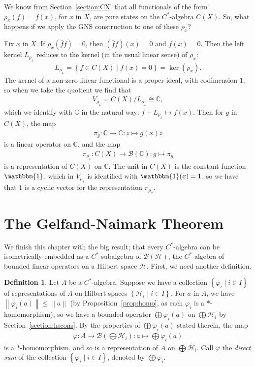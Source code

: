 \documentclass[11pt,a4paper]{report}
\theoremstyle{plain}
\theoremstyle{definition}
\newtheorem{defn}{Definition}
\newcommand{\1}{\mathbbm{1}}
\newcommand{\C}{\mathbb{C}}
\renewcommand{\H}{\mathcal{H}}
\newcommand{\B}{\mathcal{B}}
\newcommand{\BH}{\mathcal{\B(\H)}}
\renewcommand{\phi}{\varphi}
\newcommand{\CX}{C(X)}
\renewcommand{\bar}{\overline}
\renewcommand{\oplus}{\textstyle\bigoplus}
\begin{document}
We know from Section~\ref{section:CX} that all functionals of the form 
$\rho_x(f) = f(x)$, for $x$ in $X$, are pure states on the $C^\ast$-algebra 
$\CX$. So, what happens if we apply the GNS construction to one of these 
$\rho_x$?


Fix $x$ in $X$. If $\rho_x(\bar f f)=0$, then $(\bar f f)(x)=0$ and $f(x)=0$. 
Then the left kernel $L_{\rho_x}$ reduces to the kernel (in the usual linear 
sense) of $\rho_x$:
\begin{align*}
	L_{\rho_x} = \left\{f\in\CX \mid f(x) = 0\right\} = \ker(\rho_x).
\end{align*}
The kernel of a non-zero linear functional is a proper ideal, with codimension 
$1$, so when we take the quotient we find that 
\begin{align*}
	V_{\rho_x} = \CX/L_{\rho_x} \cong \C,
\end{align*}
which we identify with $\C$ in the natural way: $f+L_{\rho_x} \mapsto f(x)$.
Then for $g$ in $\CX$, the map 
\begin{align*}
	\pi_g:\C\to\C:z\mapsto g(x)z
\end{align*} 
is a linear operator on $\C$, and the map 
\begin{align*}
	\pi_{\rho_x}:\CX\to\B(\C):g\mapsto\pi_g
\end{align*} 
is a representation of $\CX$ on $\C$. The unit in $\CX$ is the constant function 
$\1$, which in $V_{\rho_x}$ is identified with $\1(x)=1$; so we have that $1$ is 
a cyclic vector for the representation $\pi_{\rho_x}$.


\section{The Gelfand-Naimark Theorem}\label{section:gn}
We finish this chapter with the big result; that every $C^\ast$-algebra can be 
isometrically embedded as a $C^\ast$-subalgebra of $\BH$, the $C^\ast$-algebra 
of bounded linear operators on a Hilbert space $\H$. First, we need another 
definition.

\begin{defn}
	Let $A$ be a $C^\ast$-algebra. Suppose we have a collection $\left\{\phi_i \mid 
	i\in I\right\}$ of representations of $A$ on Hilbert spaces $\left\{\H_i \mid 
	i\in I\right\}$. For $a$ in $A$, we have $\left\|\phi_i(a)\right\| \leq 
	\left\|a\right\|$ (by Proposition~\ref{prop:homo}, as each $\phi_i$ is a 
	$\ast$-homomorphism), so we have a bounded operator $\oplus\phi_i(a)$ on $\oplus 
	\H_i$ by Section~\ref{section:hscons}. By the properties of $\oplus\phi_i(a)$ 
	stated therein, the map
	\begin{align*}
		\phi:A\to \B(\oplus\H_i):a\mapsto\oplus\phi_i(a)
	\end{align*}
	is a $\ast$-homomorphism, and so is a representation of $A$ on $\oplus\H_i$. 
	Call $\phi$ the \emph{direct sum} of the collection $\left\{\phi_i \mid i\in 
	I\right\}$, denoted by $\oplus\phi_i$.

\end{defn}
\end{document}
